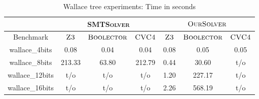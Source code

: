 \begin{table}[t]
\centering
\caption{Wallace tree experiments: Time in seconds}
\label{my-label}
\begin{tabular}{|c|c|c|c|c|c|c|}
\hline
                & \multicolumn{3}{c|}{\textsc{SMTSolver}}       & \multicolumn{3}{c|}{$\textsc{OurSolver}$}       \\ \hline
Benchmark       & $\textsc{Z3}$ & $\textsc{Boolector}$ & $\textsc{CVC4}$ & $\textsc{Z3}$ & $\textsc{Boolector}$ & $\textsc{CVC4}$ \\ \hline
wallace\_4bits  & 0.08     & 0.04        & 0.04      & 0.08     & 0.05        & 0.05      \\ \hline
wallace\_8bits  & 213.33  & 63.80      & 212.79   & 0.44     & 30.60       & t/o        \\ \hline
wallace\_12bits & t/o       & t/o          & t/o        & 1.20     & 227.17     & t/o        \\ \hline
wallace\_16bits & t/o       & t/o          & t/o        & 2.26     & 568.19    & t/o        \\ \hline
\end{tabular}
\end{table}



